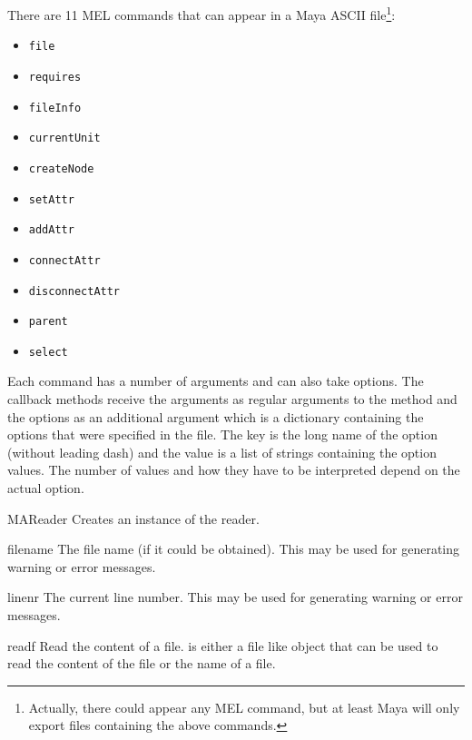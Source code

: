 There are 11 MEL commands that can appear in a Maya ASCII 
file\footnote{Actually, there could appear any MEL command, but at least
Maya will only export files containing the above commands.}:

\begin{itemize}
\item {\tt file}
\item {\tt requires}
\item {\tt fileInfo}
\item {\tt currentUnit}
\item {\tt createNode}
\item {\tt setAttr}
\item {\tt addAttr}
\item {\tt connectAttr}
\item {\tt disconnectAttr}
\item {\tt parent}
\item {\tt select}
\end{itemize}

Each command has a number of arguments and can also take options. The
callback methods receive the arguments as regular arguments to the
method and the options as an additional argument  which is
a dictionary containing the options that were specified in the
file. The key is the long name of the option (without leading dash)
and the value is a list of strings containing the option values.  The
number of values and how they have to be interpreted depend on the
actual option.

\begin{classdesc}{MAReader}{}
  Creates an instance of the reader.
\end{classdesc}

\begin{memberdesc}{filename}
The file name (if it could be obtained). This may be used for generating
warning or error messages.
\end{memberdesc}

\begin{memberdesc}{linenr}
The current line number. This may be used for generating warning or error
messages.
\end{memberdesc}

\begin{methoddesc}{read}{f}
Read the content of a file.  is either a file like object that
can be used to read the content of the file or the name of a file.
\end{methoddesc}

